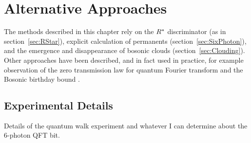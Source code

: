 \section{Alternative Approaches}
\label{sec:QCVAlternatives}
The methods described in this chapter rely on the \(R^{*}\) discriminator (as
in section~\ref{sec:RStar}), explicit calculation of permanents
(section~\ref{sec:SixPhoton}), and the emergence and disappearance of bosonic
clouds (section~\ref{sec:Clouding}). Other approaches have been described, and
in fact used in practice, for example observation of the zero transmission law
for quantum Fourier transform \cite{ztl, tichy-verification} and the Bosonic
birthday bound \cite{birthdays, experimental-birthdays}.

\subsection{Experimental Details}
\label{sec:VerificationExperiment}
Details of the quantum walk experiment and whatever I can determine about the
6-photon QFT bit.
